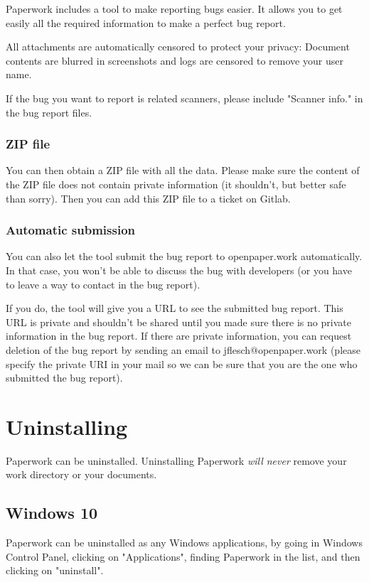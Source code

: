 \documentclass[10pt,a4paper]{article}
\begin{document}
Paperwork includes a tool to make reporting bugs easier. It allows you to get
easily all the required information to make a perfect bug report.

All attachments are automatically censored to protect your privacy: Document
contents are blurred in screenshots and logs are censored to remove your user
name.

If the bug you want to report is related scanners, please include
"Scanner info." in the bug report files.


\subsubsection{ZIP file}

You can then obtain a ZIP file with all the data. Please make sure the content
of the ZIP file does not contain private information (it shouldn't, but better
safe than sorry). Then you can add this ZIP file to a ticket on Gitlab.


\subsubsection{Automatic submission}

You can also let the tool submit the bug report to openpaper.work
automatically. In that case, you won't be able to discuss the bug with
developers (or you have to leave a way to contact in the bug report).

If you do, the tool will give you a URL to see the submitted bug report.
This URL is private and shouldn't be shared until you made sure there is no
private information in the bug report. If there are private information,
you can request deletion of the bug report by sending an email to
jflesch@openpaper.work (please specify the private URI in your mail so we can
be sure that you are the one who submitted the bug report).


\section{Uninstalling}

Paperwork can be uninstalled. Uninstalling Paperwork \emph{will never}
remove your work directory or your documents.

\subsection{Windows 10}

Paperwork can be uninstalled as any Windows applications, by going in
Windows Control Panel, clicking on "Applications", finding Paperwork in the
list, and then clicking on "uninstall".
\end{document}
